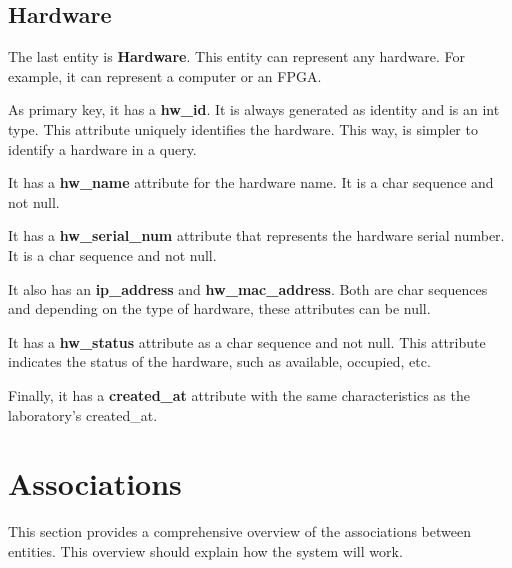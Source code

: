 \documentclass[a4paper,twoside,11pt]{article}
\begin{document}
\subsection*{Hardware}
The last entity is \textbf{Hardware}. This entity can represent any hardware. For example, it can represent a computer or an FPGA.

As primary key, it has a \textbf{hw\_id}. It is always generated as identity and is an int type. This attribute uniquely identifies the hardware. This way, is simpler to identify a hardware in a query.

It has a \textbf{hw\_name} attribute for the hardware name. It is a char sequence and not null. 

It has a \textbf{hw\_serial\_num} attribute that represents the hardware serial number. It is a char sequence and not null. 

It also has an \textbf{ip\_address} and \textbf{hw\_mac\_address}. Both are char sequences and depending on the type of hardware, these attributes can be null.

It has a \textbf{hw\_status} attribute as a char sequence and not null. This attribute indicates the status of the hardware, such as available, occupied, etc.

Finally, it has a \textbf{created\_at} attribute with the same characteristics as the laboratory's created\_at.

\section*{Associations}
This section provides a comprehensive overview of the associations between entities. This overview should explain how the system will work.
\end{document}
